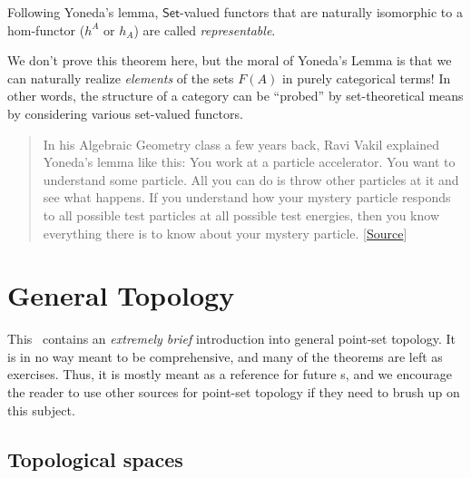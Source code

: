 \begin{defn}
    Following Yoneda's lemma, $\mathsf{Set}$-valued functors that are naturally isomorphic to a hom-functor ($h^A$ or $h_A$) are called \emph{representable}.
\end{defn}
\begin{rem}
We don't prove this theorem here, but the moral of Yoneda's Lemma
is that we can naturally realize \emph{elements} of the sets
$F(A)$ in purely categorical terms! In other words, the structure of a category can be ``probed'' by set-theoretical means by considering various set-valued functors.
\end{rem}
\begin{quote}
\small In his Algebraic Geometry class a few years back, Ravi Vakil
explained Yoneda's lemma like this: You work at a particle accelerator.
You want to understand some particle. All you can do is throw other
particles at it and see what happens. If you understand how your mystery
particle responds to all possible test particles at all possible test
energies, then you know everything there is to know about your mystery
particle. {[}\href{https://mathoverflow.net/a/3223/22773}{Source}{]}
\end{quote}

\clearpage
\chapter{General Topology}

This \chap\ contains an \emph{extremely brief} introduction into general point-set topology. It is in no way meant to be comprehensive, and many of the theorems are left as exercises. Thus, it is mostly meant as a reference for future \chap s, and we encourage the reader to use other sources for point-set topology if they need to brush up on this subject.


\section{Topological spaces}

